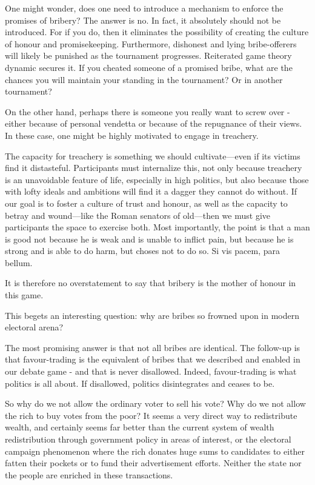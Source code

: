 One might wonder, does one need to introduce a mechanism to enforce the promises of bribery? The answer is no. In fact, it absolutely should not be introduced. For if you do, then it eliminates the possibility of creating the culture of honour and promisekeeping. Furthermore, dishonest and lying bribe-offerers will likely be punished as the tournament progresses. Reiterated game theory dynamic secures it. If you cheated someone of a promised bribe, what are the chances you will maintain your standing in the tournament? Or in another tournament? 

On the other hand, perhaps there is someone you really want to screw over - either because of personal vendetta or because of the repugnance of their views. In these case, one might be highly motivated to engage in treachery.

The capacity for treachery is something we should cultivate—even if its victims find it distasteful. Participants must internalize this, not only because treachery is an unavoidable feature of life, especially in high politics, but also because those with lofty ideals and ambitions will find it a dagger they cannot do without. If our goal is to foster a culture of trust and honour, as well as the capacity to betray and wound—like the Roman senators of old—then we must give participants the space to exercise both. Most importantly, the point is that a man is good not because he is weak and is unable to inflict pain, but because he is strong and is able to do harm, but choses not to do so. Si vis pacem, para bellum.


It is therefore no overstatement to say that bribery is the mother of honour in this game. 


This begets an interesting question: why are bribes so frowned upon in modern electoral arena? 

The most promising answer is that not all bribes are identical. The follow-up is that favour-trading is the equivalent of bribes that we described and enabled in our debate game - and that is never disallowed. Indeed, favour-trading is what politics is all about. If disallowed, politics disintegrates and ceases to be. 


So why do we not allow the ordinary voter to sell his vote? Why do we not allow the rich to buy votes from the poor? It seems a very direct way to redistribute wealth, and certainly seems far better than the current system of wealth redistribution through government policy in areas of interest, or the electoral campaign phenomenon where the rich donates huge sums to candidates to either fatten their pockets or to fund their advertisement efforts. Neither the state nor the people are enriched in these transactions. 


